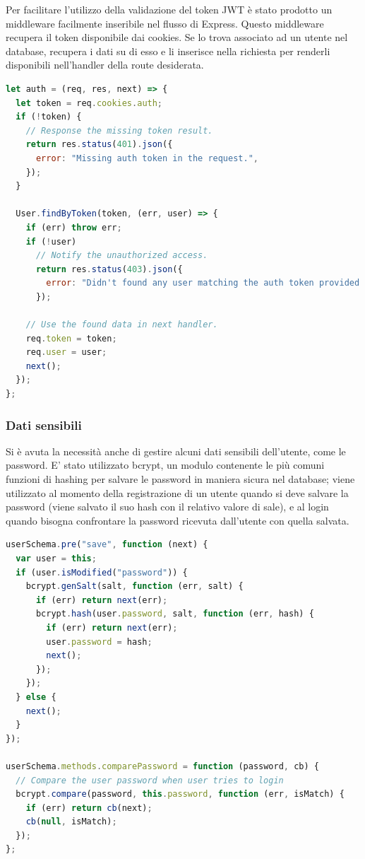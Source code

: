 Per facilitare l'utilizzo della validazione del token JWT è stato prodotto un middleware facilmente inseribile nel flusso di Express. Questo middleware recupera il token disponibile dai cookies. Se lo trova associato ad un utente nel database, recupera i dati su di esso e li inserisce nella richiesta per renderli disponibili nell'handler della
route desiderata.

\begin{lstlisting}[language=Javascript]
let auth = (req, res, next) => {
  let token = req.cookies.auth;
  if (!token) {
    // Response the missing token result.
    return res.status(401).json({
      error: "Missing auth token in the request.",
    });
  }

  User.findByToken(token, (err, user) => {
    if (err) throw err;
    if (!user)
      // Notify the unauthorized access.
      return res.status(403).json({
        error: "Didn't found any user matching the auth token provided.",
      });

    // Use the found data in next handler.
    req.token = token;
    req.user = user;
    next();
  });
};
\end{lstlisting}

\subsubsection{Dati sensibili}

Si è avuta la necessità anche di gestire alcuni dati sensibili dell'utente, come le password. E' stato utilizzato bcrypt, un modulo contenente le più comuni funzioni di hashing per salvare le password in maniera sicura
nel database; viene utilizzato al momento della registrazione di un utente
quando si deve salvare la password (viene salvato il suo hash con il
relativo valore di sale), e al login quando bisogna confrontare la password
ricevuta dall’utente con quella salvata.

\begin{lstlisting}[language=Javascript]
userSchema.pre("save", function (next) {
  var user = this;
  if (user.isModified("password")) {
    bcrypt.genSalt(salt, function (err, salt) {
      if (err) return next(err);
      bcrypt.hash(user.password, salt, function (err, hash) {
        if (err) return next(err);
        user.password = hash;
        next();
      });
    });
  } else {
    next();
  }
});

userSchema.methods.comparePassword = function (password, cb) {
  // Compare the user password when user tries to login
  bcrypt.compare(password, this.password, function (err, isMatch) {
    if (err) return cb(next);
    cb(null, isMatch);
  });
};
\end{lstlisting}

